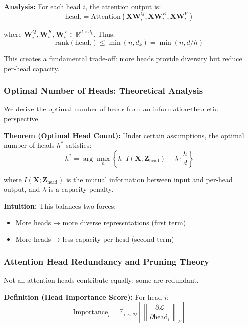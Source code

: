 \documentclass[11pt]{article}
\begin{document}
\textbf{Analysis:} For each head $i$, the attention output is:
\begin{equation}
\text{head}_i = \text{Attention}(\mathbf{X}\mathbf{W}_i^Q, \mathbf{X}\mathbf{W}_i^K, \mathbf{X}\mathbf{W}_i^V)
\end{equation}

where $\mathbf{W}_i^Q, \mathbf{W}_i^K, \mathbf{W}_i^V \in \mathbb{R}^{d \times d_k}$. Thus:
\begin{equation}
\text{rank}(\text{head}_i) \leq \min(n, d_k) = \min(n, d/h)
\end{equation}

This creates a fundamental trade-off: more heads provide diversity but reduce per-head capacity.

\subsubsection{Optimal Number of Heads: Theoretical Analysis}

We derive the optimal number of heads from an information-theoretic perspective.

\textbf{Theorem (Optimal Head Count):} Under certain assumptions, the optimal number of heads $h^*$ satisfies:
\begin{equation}
h^* = \arg\max_h \left\{ h \cdot I(\mathbf{X}; \mathbf{Z}_{\text{head}}) - \lambda \cdot \frac{h}{d} \right\}
\end{equation}

where $I(\mathbf{X}; \mathbf{Z}_{\text{head}})$ is the mutual information between input and per-head output, and $\lambda$ is a capacity penalty.

\textbf{Intuition:} This balances two forces:
\begin{itemize}
    \item More heads → more diverse representations (first term)
    \item More heads → less capacity per head (second term)
\end{itemize}

\subsubsection{Attention Head Redundancy and Pruning Theory}

Not all attention heads contribute equally; some are redundant.

\textbf{Definition (Head Importance Score):} For head $i$:
\begin{equation}
\text{Importance}_i = \mathbb{E}_{\mathbf{x} \sim \mathcal{D}} \left[ \left\| \frac{\partial \mathcal{L}}{\partial \text{head}_i} \right\|_F \right]
\end{equation}
\end{document}
